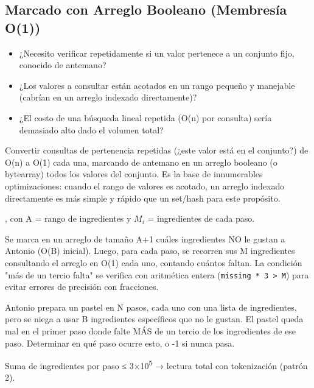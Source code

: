 \subsection{Marcado con Arreglo Booleano (Membresía O(1))}


\begin{itemize}
\item ¿Necesito verificar repetidamente si un valor pertenece a un conjunto fijo, conocido de antemano?
\item ¿Los valores a consultar están acotados en un rango pequeño y manejable (cabrían en un arreglo indexado directamente)?
\item ¿El costo de una búsqueda lineal repetida (O(n) por consulta) sería demasiado alto dado el volumen total?
\end{itemize}

 Convertir consultas de pertenencia repetidas (¿este valor está en el conjunto?) de O(n) a O(1) cada una, marcando de antemano en un arreglo booleano (o bytearray) todos los valores del conjunto. Es la base de innumerables optimizaciones: cuando el rango de valores es acotado, un arreglo indexado directamente es más simple y rápido que un set/hash para este propósito.

 , con A = rango de ingredientes y $M_i$ = ingredientes de cada paso.

 Se marca en un arreglo de tamaño A+1 cuáles ingredientes NO le gustan a Antonio (O(B) inicial). Luego, para cada paso, se recorren sus M ingredientes consultando el arreglo en O(1) cada uno, contando cuántos faltan. La condición "más de un tercio falta" se verifica con aritmética entera (\texttt{missing * 3 > M}) para evitar errores de precisión con fracciones.


Antonio prepara un pastel en N pasos, cada uno con una lista de ingredientes, pero se niega a usar B ingredientes específicos que no le gustan. El pastel queda mal en el primer paso donde falte MÁS de un tercio de los ingredientes de ese paso. Determinar en qué paso ocurre esto, o -1 si nunca pasa.

 Suma de ingredientes por paso ≤ 3×10\textsuperscript{5} → lectura total con tokenización (patrón 2).



